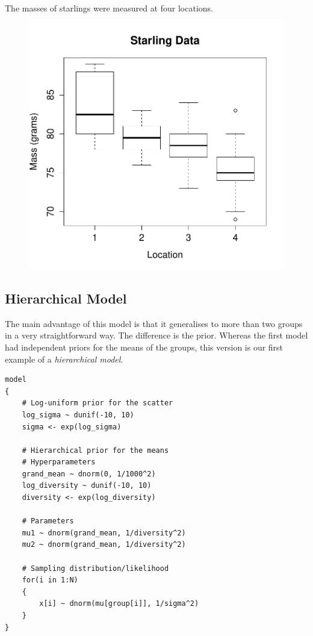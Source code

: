 The masses of starlings were measured at four locations.

\begin{figure}[ht!]
\begin{center}
\includegraphics[scale=0.6]{Figures/starling.pdf}
\end{center}
\end{figure}


\subsection{Hierarchical Model}
The main advantage of this model is that it generalises to more than two groups
in a very straightforward way. The difference is the prior. Whereas the first
model had independent priors for the means of the groups, this version is our
first example of a {\it hierarchical model}.
\begin{framed}
\begin{verbatim}
model
{
    # Log-uniform prior for the scatter
    log_sigma ~ dunif(-10, 10)
    sigma <- exp(log_sigma)

    # Hierarchical prior for the means
    # Hyperparameters
    grand_mean ~ dnorm(0, 1/1000^2)
    log_diversity ~ dunif(-10, 10)
    diversity <- exp(log_diversity)

    # Parameters
    mu1 ~ dnorm(grand_mean, 1/diversity^2)
    mu2 ~ dnorm(grand_mean, 1/diversity^2)

    # Sampling distribution/likelihood
    for(i in 1:N)
    {
        x[i] ~ dnorm(mu[group[i]], 1/sigma^2)
    }
}

\end{verbatim}
\end{framed}


